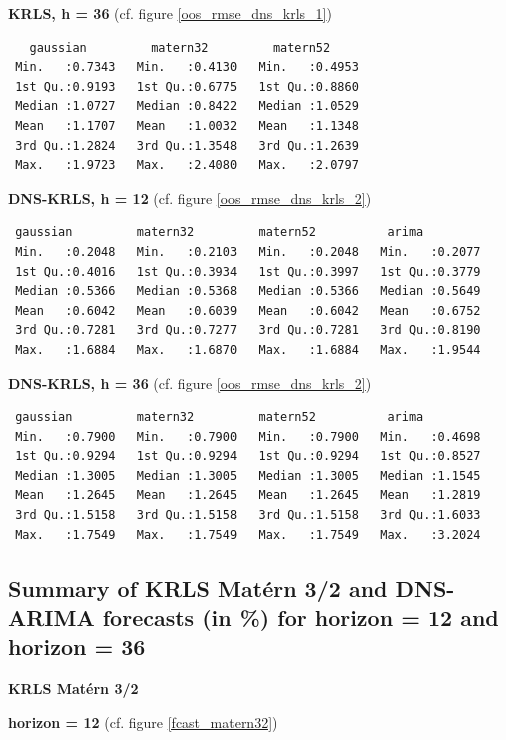 \textbf{KRLS, h = 36} (cf. figure \ref{oos_rmse_dns_krls_1}) 

\begin{verbatim}
   gaussian         matern32         matern52     
 Min.   :0.7343   Min.   :0.4130   Min.   :0.4953  
 1st Qu.:0.9193   1st Qu.:0.6775   1st Qu.:0.8860  
 Median :1.0727   Median :0.8422   Median :1.0529  
 Mean   :1.1707   Mean   :1.0032   Mean   :1.1348  
 3rd Qu.:1.2824   3rd Qu.:1.3548   3rd Qu.:1.2639  
 Max.   :1.9723   Max.   :2.4080   Max.   :2.0797 
\end{verbatim}

\textbf{DNS-KRLS, h = 12} (cf. figure \ref{oos_rmse_dns_krls_2})

\begin{verbatim}
 gaussian         matern32         matern52          arima       
 Min.   :0.2048   Min.   :0.2103   Min.   :0.2048   Min.   :0.2077  
 1st Qu.:0.4016   1st Qu.:0.3934   1st Qu.:0.3997   1st Qu.:0.3779  
 Median :0.5366   Median :0.5368   Median :0.5366   Median :0.5649  
 Mean   :0.6042   Mean   :0.6039   Mean   :0.6042   Mean   :0.6752  
 3rd Qu.:0.7281   3rd Qu.:0.7277   3rd Qu.:0.7281   3rd Qu.:0.8190  
 Max.   :1.6884   Max.   :1.6870   Max.   :1.6884   Max.   :1.9544 
\end{verbatim}

\textbf{DNS-KRLS, h = 36} (cf. figure \ref{oos_rmse_dns_krls_2})

\begin{verbatim}
 gaussian         matern32         matern52          arima       
 Min.   :0.7900   Min.   :0.7900   Min.   :0.7900   Min.   :0.4698  
 1st Qu.:0.9294   1st Qu.:0.9294   1st Qu.:0.9294   1st Qu.:0.8527  
 Median :1.3005   Median :1.3005   Median :1.3005   Median :1.1545  
 Mean   :1.2645   Mean   :1.2645   Mean   :1.2645   Mean   :1.2819  
 3rd Qu.:1.5158   3rd Qu.:1.5158   3rd Qu.:1.5158   3rd Qu.:1.6033  
 Max.   :1.7549   Max.   :1.7549   Max.   :1.7549   Max.   :3.2024  
\end{verbatim}



\subsection{Summary of KRLS Mat\'ern 3/2 and DNS-ARIMA forecasts (in \%) for horizon = 12 and horizon = 36}
\label{appendix_summary_forecast}

\textbf{KRLS Mat\'ern 3/2}

\textbf{horizon = 12} (cf. figure \ref{fcast_matern32})

